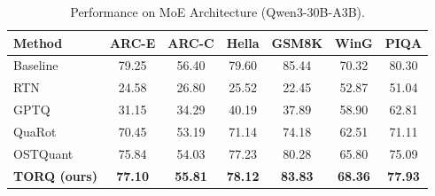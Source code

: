 \begin{table}[h]
\centering
\caption{Performance on MoE Architecture (Qwen3-30B-A3B).}
\label{tab:moe}
\begin{tabular}{lcccccc}
\toprule
\textbf{Method} & \textbf{ARC-E} & \textbf{ARC-C} & \textbf{Hella} & \textbf{GSM8K} & \textbf{WinG} & \textbf{PIQA} \\
\midrule
Baseline & 79.25 & 56.40 & 79.60 & 85.44 & 70.32 & 80.30 \\
RTN & 24.58 & 26.80 & 25.52 & 22.45 & 52.87 & 51.04 \\
GPTQ & 31.15 & 34.29 & 40.19 & 37.89 & 58.90 & 62.81 \\
QuaRot & 70.45 & 53.19 & 71.14 & 74.18 & 62.51 & 71.11 \\
OSTQuant & 75.84 & 54.03 & 77.23 & 80.28 & 65.80 & 75.09 \\
\textbf{TORQ (ours)} & \textbf{77.10} & \textbf{55.81} & \textbf{78.12} & \textbf{83.83} & \textbf{68.36} & \textbf{77.93} \\
\bottomrule
\end{tabular}
\end{table}